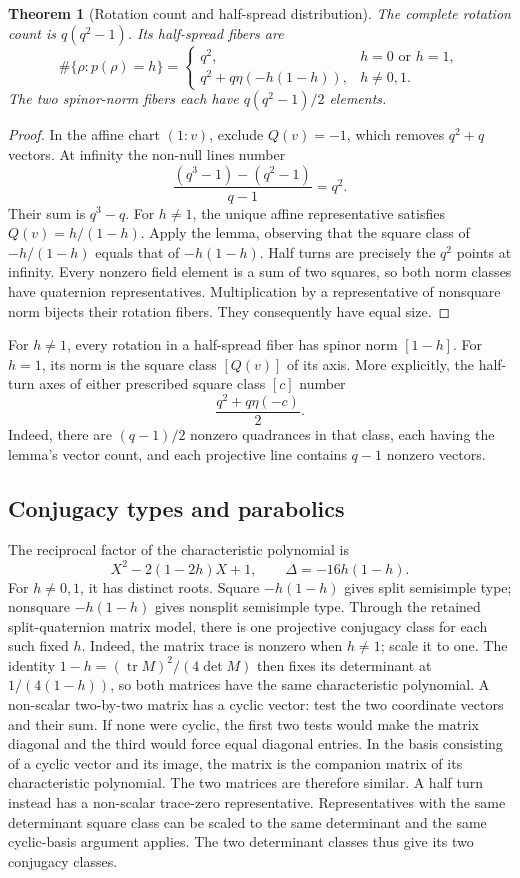 \documentclass[11pt]{article}
\newcommand{\tr}{\operatorname{tr}}
\newtheorem{theorem}{Theorem}[section]
\theoremstyle{remark}
\begin{document}
\begin{theorem}[Rotation count and half-spread distribution]
The complete rotation count is \(q(q^2-1)\). Its half-spread fibers are
\[
 \#\{\rho:p(\rho)=h\}=
 \begin{cases}
 q^2,&h=0\text{ or }h=1,\\
 q^2+q\eta(-h(1-h)),&h\ne0,1.
 \end{cases}
\]
The two spinor-norm fibers each have \(q(q^2-1)/2\) elements.
\end{theorem}
\begin{proof}
In the affine chart \((1:v)\), exclude \(Q(v)=-1\), which removes
\(q^2+q\) vectors. At infinity the non-null lines number
\[
 \frac{(q^3-1)-(q^2-1)}{q-1}=q^2.
\]
Their sum is \(q^3-q\). For \(h\ne1\), the unique affine representative
satisfies \(Q(v)=h/(1-h)\). Apply the lemma, observing that the square
class of \(-h/(1-h)\) equals that of \(-h(1-h)\).
Half turns are precisely the \(q^2\) points at infinity.
Every nonzero field element is a sum of two squares, so both norm classes
have quaternion representatives. Multiplication by a representative of
nonsquare norm bijects their rotation fibers. They consequently have equal
size.
\end{proof}

For \(h\ne1\), every rotation in a half-spread fiber has spinor norm
\([1-h]\). For \(h=1\), its norm is the square class \([Q(v)]\) of its
axis. More explicitly, the half-turn axes of either prescribed square class
\([c]\) number
\[
 \frac{q^2+q\eta(-c)}2.
\]
Indeed, there are \((q-1)/2\) nonzero quadrances in that class, each having
the lemma's vector count, and each projective line contains \(q-1\)
nonzero vectors.

\subsection{Conjugacy types and parabolics}

The reciprocal factor of the characteristic polynomial is
\[
 X^2-2(1-2h)X+1,\qquad \Delta=-16h(1-h).
\]
For \(h\ne0,1\), it has distinct roots. Square \(-h(1-h)\) gives split
semisimple type; nonsquare \(-h(1-h)\) gives nonsplit semisimple type.
Through the retained split-quaternion matrix model, there is one projective
conjugacy class for each such fixed \(h\). Indeed, the matrix trace is nonzero
when \(h\ne1\); scale it to one. The identity
\(1-h=(\tr M)^2/(4\det M)\) then fixes its determinant at
\(1/(4(1-h))\), so both matrices have the same characteristic polynomial.
A non-scalar two-by-two matrix has a cyclic vector: test the two coordinate
vectors and their sum. If none were cyclic, the first two tests would make
the matrix diagonal and the third would force equal diagonal entries.
In the basis consisting of a cyclic vector and its image, the matrix is
the companion matrix of its characteristic polynomial. The two matrices
are therefore similar. A half turn instead has a non-scalar trace-zero
representative. Representatives with the same determinant square class can
be scaled to the same determinant and the same cyclic-basis argument
applies. The two determinant classes thus give its two conjugacy classes.
\end{document}
